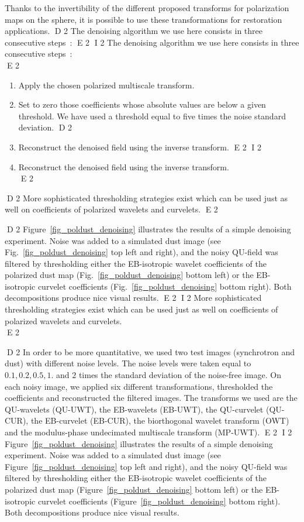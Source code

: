 Thanks to the invertibility of the different proposed transforms for polarization maps on the sphere, it is possible to use these transformations for restoration applications. 
D 2
The denoising algorithm we use here consists in three consecutive steps~:
E 2
I 2
The denoising algorithm we use here consists in three consecutive steps~:\\
E 2
\begin{enumerate}
\item Apply the chosen polarized multiscale transform. 
\item Set to zero those coefficients whose absolute values are below a given threshold. We have used a threshold equal to five times the noise standard deviation.
D 2
\item Reconstruct the denoised field using the inverse transform.
E 2
I 2
\item Reconstruct the denoised field using the inverse transform.\\
E 2
\end{enumerate}
D 2
More sophisticated thresholding strategies exist \citep{starck:book06} which can be used just as well on coefficients of polarized wavelets and curvelets.
E 2

D 2
Figure~\ref{fig_poldust_denoising} illustrates  the results of a simple denoising experiment. 
Noise was added to a simulated dust image (see Fig.~\ref{fig_poldust_denoising} top left and right), and the noisy QU-field was filtered  by thresholding either the EB-isotropic wavelet coefficients of the polarized dust map (Fig.~\ref{fig_poldust_denoising} bottom left)
or the EB-isotropic curvelet coefficients (Fig.~\ref{fig_poldust_denoising} bottom right). Both decompositions produce nice visual results.
E 2
I 2
More sophisticated thresholding strategies exist \citep{starck:book06} which can be used just as well on coefficients of polarized wavelets and curvelets.\\
E 2

D 2
In order to be more quantitative, we used two test images (synchrotron and dust) with different noise levels. The noise levels were taken equal to $0.1,0.2,0.5,1.$ and $2$ times the standard deviation of the noise-free image.
On each noisy image, we applied six different transformations, thresholded  the coefficients and reconstructed the filtered images. The transforms we used are the QU-wavelets  (QU-UWT), 
the EB-wavelets (EB-UWT), the QU-curvelet  (QU-CUR),  the EB-curvelet (EB-CUR), the biorthogonal wavelet transform (OWT) and the modulus-phase undecimated multiscale transform (MP-UWT).
E 2
I 2
Figure~\ref{fig_poldust_denoising} illustrates  the results of a simple denoising experiment. 
Noise was added to a simulated dust image (see Figure~\ref{fig_poldust_denoising} top left and right), 
and the noisy QU-field was filtered  by thresholding either the EB-isotropic wavelet coefficients 
of the polarized dust map (Figure~\ref{fig_poldust_denoising} bottom left) or the EB-isotropic 
curvelet coefficients (Figure~\ref{fig_poldust_denoising} bottom right). Both decompositions produce nice visual results.\\

